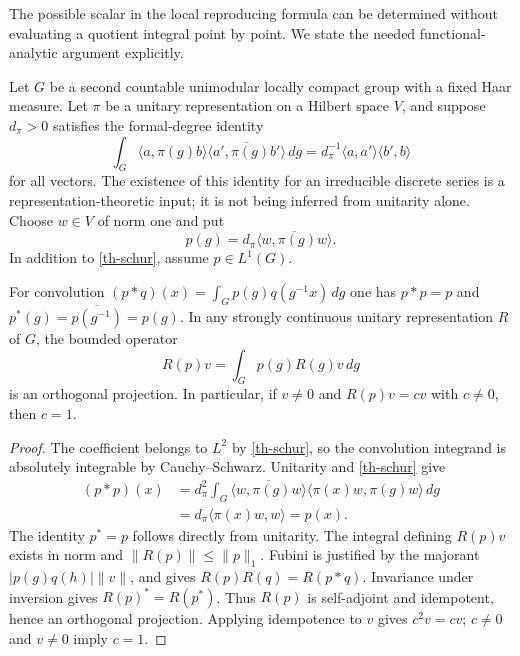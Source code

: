 The possible scalar in the local reproducing formula can be determined
without evaluating a quotient integral point by point.  We state the
needed functional-analytic argument explicitly.

Let $G$ be a second countable unimodular locally compact group with a
fixed Haar measure.  Let $\pi$ be a unitary representation on a Hilbert
space $V$, and suppose $d_\pi>0$ satisfies the formal-degree identity
\begin{equation}\label{th-schur}
 \int_G\langle a,\pi(g)b\rangle
       \overline{\langle a',\pi(g)b'\rangle}\,dg
   =d_\pi^{-1}\langle a,a'\rangle\langle b',b\rangle
\end{equation}
for all vectors.  The existence of this identity for an irreducible
discrete series is a representation-theoretic input; it is not being
inferred from unitarity alone.  Choose $w\in V$ of norm one and put
\[
 p(g)=d_\pi\overline{\langle w,\pi(g)w\rangle}.
\]
In addition to \eqref{th-schur}, assume $p\in L^1(G)$.

\begin{lemma}\label{th-projection}
For convolution $(p*q)(x)=\int_Gp(g)q(g^{-1}x)\,dg$ one has
$p*p=p$ and $p^*(g)=\overline{p(g^{-1})}=p(g)$.
In any strongly continuous unitary representation $R$ of $G$, the
bounded operator
\[
 R(p)v=\int_Gp(g)R(g)v\,dg
\]
is an orthogonal projection.  In particular, if $v\ne0$ and
$R(p)v=cv$ with $c\ne0$, then $c=1$.
\end{lemma}

\begin{proof}
The coefficient belongs to $L^2$ by \eqref{th-schur}, so the
convolution integrand is absolutely integrable by Cauchy--Schwarz.
Unitarity and \eqref{th-schur} give
\begin{align*}
 (p*p)(x)
 &=d_\pi^2\int_G
    \overline{\langle w,\pi(g)w\rangle}
    \langle\pi(x)w,\pi(g)w\rangle\,dg\\
 &=d_\pi\langle\pi(x)w,w\rangle=p(x).
\end{align*}
The identity $p^*=p$ follows directly from unitarity.
The integral defining $R(p)v$ exists in norm and
$\|R(p)\|\le\|p\|_1$.  Fubini is justified by the majorant
$|p(g)q(h)|\|v\|$, and gives $R(p)R(q)=R(p*q)$.
Invariance under inversion gives $R(p)^*=R(p^*)$.
Thus $R(p)$ is self-adjoint and idempotent, hence an orthogonal
projection.  Applying idempotence to $v$ gives $c^2v=cv$;
$c\ne0$ and $v\ne0$ imply $c=1$.
\end{proof}

